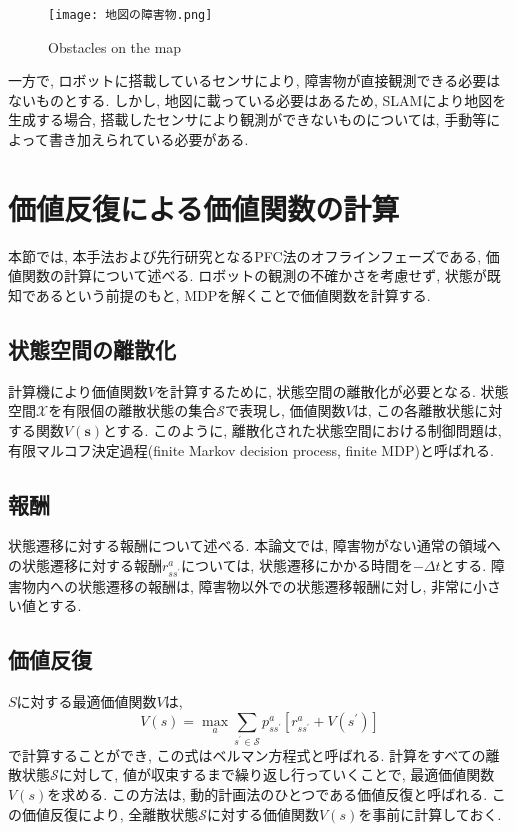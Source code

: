 \begin{figure}[H]
  \begin{center}
    \texttt{[image: 地図の障害物.png]}
    \caption{Obstacles on the map}
    \label{fig:地図の障害物}
  \end{center}
\end{figure}

一方で, ロボットに搭載しているセンサにより, 障害物が直接観測できる必要はないものとする. 
しかし, 地図に載っている必要はあるため, SLAMにより地図を生成する場合, 
搭載したセンサにより観測ができないものについては, 手動等によって書き加えられている必要がある. 


\section{価値反復による価値関数の計算} \label{section:価値関数}
本節では, 本手法および先行研究となるPFC法のオフラインフェーズである, 価値関数の計算について述べる. 
ロボットの観測の不確かさを考慮せず, 状態が既知であるという前提のもと, MDPを解くことで価値関数を計算する. 

\subsection{状態空間の離散化}
計算機により価値関数$V$を計算するために, 状態空間の離散化が必要となる. 
状態空間$\mathcal{X}$を有限個の離散状態の集合$\mathcal{S}$で表現し, 
価値関数$V$は, この各離散状態に対する関数$V(\bm{s})$とする. 
このように, 離散化された状態空間における制御問題は, 有限マルコフ決定過程(finite Markov decision process, finite MDP)と呼ばれる. 

\subsection{報酬} \label{subsection:報酬}
状態遷移に対する報酬について述べる. 
本論文では, 障害物がない通常の領域への状態遷移に対する報酬$r^{a}_{ss^{\prime}}$については, 状態遷移にかかる時間を$-\Delta t$とする. 
障害物内への状態遷移の報酬は, 障害物以外での状態遷移報酬に対し, 非常に小さい値とする. 

\subsection{価値反復}
$S$に対する最適価値関数$V$は, 
\begin{equation}
\label{bellman equation}
  V(s) = \max_{a} \sum_{s^{\prime} \in \mathcal{S}}
         p^{a}_{ss^{\prime}} \left[ r^{a}_{ss^{\prime}} + V(s^{\prime}) \right]
\end{equation}
で計算することができ, この式はベルマン方程式と呼ばれる. 
計算をすべての離散状態$\mathcal{S}$に対して, 値が収束するまで繰り返し行っていくことで, 最適価値関数$V(s)$を求める. 
この方法は, 動的計画法のひとつである価値反復と呼ばれる. 
この価値反復により, 全離散状態$\mathcal{S}$に対する価値関数$V(s)$を事前に計算しておく. 



